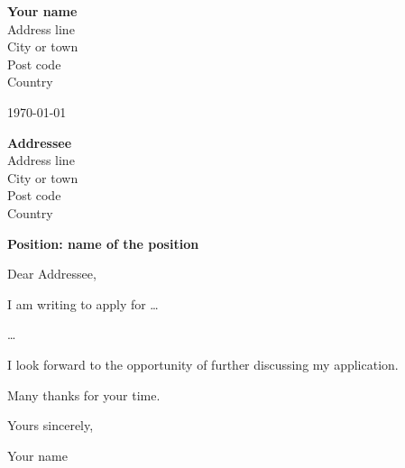 \documentclass[12pt]{article}
\begin{document}
\bigskip

\begin{flushright}
  \textbf{Your name}\\
  Address line\\
  City or town\\
  Post code\\
  Country
\end{flushright}

\medskip

\today

\medskip

\textbf{Addressee}\\
Address line\\
City or town\\
Post code\\
Country

\bigskip

\textbf{Position: name of the position}

\bigskip

Dear Addressee,

I am writing to apply for \dots

\dots

\medskip

I look forward to the opportunity of further discussing my application.

Many thanks for your time.

\medskip

Yours sincerely,

\bigskip


\bigskip

Your name
\end{document}
